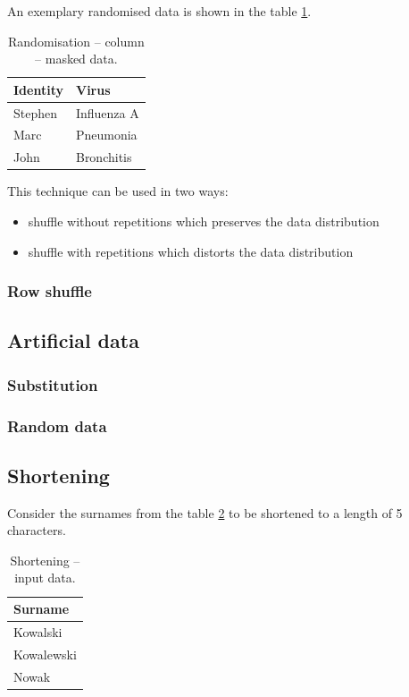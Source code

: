 \documentclass[a4paper,twoside,12pt]{book}
\begin{document}
An exemplary randomised data is shown in the table \ref{id:tab:column_randomisation_masked}.

\begin{table}[h]
\centering
\caption{Randomisation – column – masked data.}
\label{id:tab:column_randomisation_masked}
\begin{tabular}{ll}
\toprule
Identity & Virus \\ \midrule
Stephen & Influenza A \\
Marc & Pneumonia \\
John & Bronchitis \\ \bottomrule
\end{tabular}
\end{table}

This technique can be used in two ways:
\begin{itemize}
\item shuffle without repetitions which preserves the data distribution
\item shuffle with repetitions which distorts the data distribution
\end{itemize}



\subsubsection{Row shuffle}
\subsection{Artificial data}
\subsubsection{Substitution}
\subsubsection{Random data}
\subsection{Shortening}
Consider the surnames from the table \ref{id:tab:shortening_raw} to be shortened to a length of 5 characters.

\begin{table}[h]
\centering
\caption{Shortening – input data.}
\label{id:tab:shortening_raw}
\begin{tabular}{l}
\toprule
Surname    \\ \midrule
Kowalski   \\
Kowalewski \\
Nowak      \\ \bottomrule
\end{tabular}
\end{table}
\end{document}
